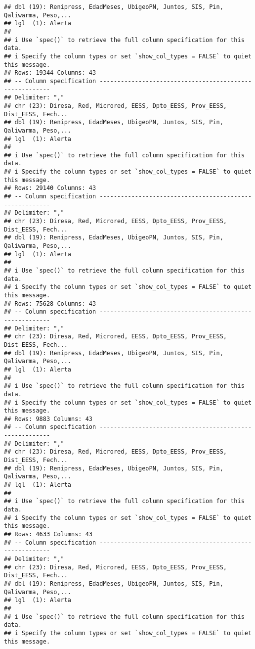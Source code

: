\documentclass[
]{article}
\begin{document}
\begin{verbatim}
## dbl (19): Renipress, EdadMeses, UbigeoPN, Juntos, SIS, Pin, Qaliwarma, Peso,...
## lgl  (1): Alerta
## 
## i Use `spec()` to retrieve the full column specification for this data.
## i Specify the column types or set `show_col_types = FALSE` to quiet this message.
## Rows: 19344 Columns: 43
## -- Column specification --------------------------------------------------------
## Delimiter: ","
## chr (23): Diresa, Red, Microred, EESS, Dpto_EESS, Prov_EESS, Dist_EESS, Fech...
## dbl (19): Renipress, EdadMeses, UbigeoPN, Juntos, SIS, Pin, Qaliwarma, Peso,...
## lgl  (1): Alerta
## 
## i Use `spec()` to retrieve the full column specification for this data.
## i Specify the column types or set `show_col_types = FALSE` to quiet this message.
## Rows: 29140 Columns: 43
## -- Column specification --------------------------------------------------------
## Delimiter: ","
## chr (23): Diresa, Red, Microred, EESS, Dpto_EESS, Prov_EESS, Dist_EESS, Fech...
## dbl (19): Renipress, EdadMeses, UbigeoPN, Juntos, SIS, Pin, Qaliwarma, Peso,...
## lgl  (1): Alerta
## 
## i Use `spec()` to retrieve the full column specification for this data.
## i Specify the column types or set `show_col_types = FALSE` to quiet this message.
## Rows: 75628 Columns: 43
## -- Column specification --------------------------------------------------------
## Delimiter: ","
## chr (23): Diresa, Red, Microred, EESS, Dpto_EESS, Prov_EESS, Dist_EESS, Fech...
## dbl (19): Renipress, EdadMeses, UbigeoPN, Juntos, SIS, Pin, Qaliwarma, Peso,...
## lgl  (1): Alerta
## 
## i Use `spec()` to retrieve the full column specification for this data.
## i Specify the column types or set `show_col_types = FALSE` to quiet this message.
## Rows: 9883 Columns: 43
## -- Column specification --------------------------------------------------------
## Delimiter: ","
## chr (23): Diresa, Red, Microred, EESS, Dpto_EESS, Prov_EESS, Dist_EESS, Fech...
## dbl (19): Renipress, EdadMeses, UbigeoPN, Juntos, SIS, Pin, Qaliwarma, Peso,...
## lgl  (1): Alerta
## 
## i Use `spec()` to retrieve the full column specification for this data.
## i Specify the column types or set `show_col_types = FALSE` to quiet this message.
## Rows: 4633 Columns: 43
## -- Column specification --------------------------------------------------------
## Delimiter: ","
## chr (23): Diresa, Red, Microred, EESS, Dpto_EESS, Prov_EESS, Dist_EESS, Fech...
## dbl (19): Renipress, EdadMeses, UbigeoPN, Juntos, SIS, Pin, Qaliwarma, Peso,...
## lgl  (1): Alerta
## 
## i Use `spec()` to retrieve the full column specification for this data.
## i Specify the column types or set `show_col_types = FALSE` to quiet this message.

\end{verbatim}
\end{document}
